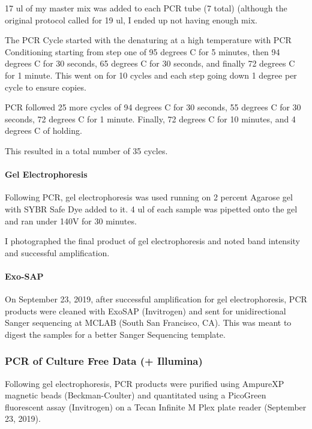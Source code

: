 \documentclass[]{article}
\let\oldparagraph\paragraph
\renewcommand{\paragraph}[1]{\oldparagraph{#1}\mbox{}}
\begin{document}
17 ul of my master mix was added to each PCR tube (7 total) (although
the original protocol called for 19 ul, I ended up not having enough
mix.

The PCR Cycle started with the denaturing at a high temperature with PCR
Conditioning starting from step one of 95 degrees C for 5 minutes, then
94 degrees C for 30 seconds, 65 degrees C for 30 seconds, and finally 72
degrees C for 1 minute. This went on for 10 cycles and each step going
down 1 degree per cycle to ensure copies.

PCR followed 25 more cycles of 94 degrees C for 30 seconds, 55 degrees C
for 30 seconds, 72 degrees C for 1 minute. Finally, 72 degrees C for 10
minutes, and 4 degrees C of holding.

This resulted in a total number of 35 cycles.

\hypertarget{gel-electrophoresis}{%
\paragraph{Gel Electrophoresis}\label{gel-electrophoresis}}

Following PCR, gel electrophoresis was used running on 2 percent Agarose
gel with SYBR Safe Dye added to it. 4 ul of each sample was pipetted
onto the gel and ran under 140V for 30 minutes.

I photographed the final product of gel electrophoresis and noted band
intensity and successful amplification.

\hypertarget{exo-sap}{%
\paragraph{Exo-SAP}\label{exo-sap}}

On September 23, 2019, after successful amplification for gel
electrophoresis, PCR products were cleaned with ExoSAP (Invitrogen) and
sent for unidirectional Sanger sequencing at MCLAB (South San Francisco,
CA). This was meant to digest the samples for a better Sanger Sequencing
template.

\hypertarget{pcr-of-culture-free-data-illumina}{%
\subsubsection{PCR of Culture Free Data (+
Illumina)}\label{pcr-of-culture-free-data-illumina}}

Following gel electrophoresis, PCR products were purified using AmpureXP
magnetic beads (Beckman-Coulter) and quantitated using a PicoGreen
fluorescent assay (Invitrogen) on a Tecan Infinite M Plex plate reader
(September 23, 2019).
\end{document}

